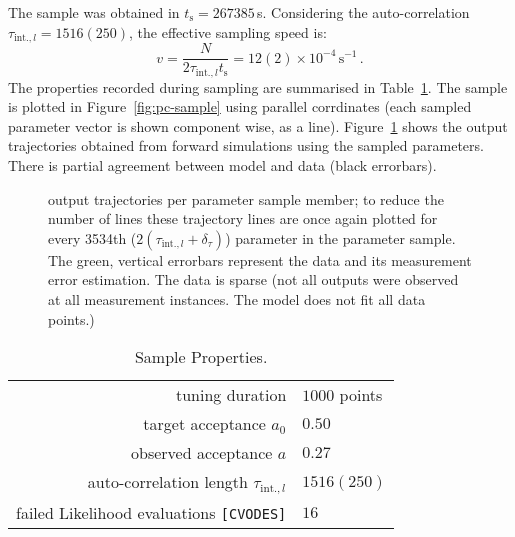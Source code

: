 \documentclass[english]{scrartcl}
\begin{document}
The sample was obtained in $t_{\text{s}}=267385$\,s. Considering the
auto-correlation $\tau_{\text{int.},l}=1516(250)$, the effective
sampling speed is:
\begin{equation}
  \label{eq:speed}
  v=\frac{N}{2\tau_{\text{int.},l} t_{\text{s}}}=12(2)\times 10^{-4}\,\text{s}^{-1}\,.
\end{equation}
The properties recorded during sampling are summarised in
Table~\ref{tab:sp}. The sample is plotted in
Figure~\ref{fig:pc-sample} using parallel corrdinates (each sampled
parameter vector is shown component wise, as a
line). Figure~\ref{fig:osmpl} shows the output trajectories obtained
from forward simulations using the sampled parameters. There is
partial agreement between model and data (black errorbars).
\begin{figure}
  \sffamily\tiny
  \hspace*{-3cm}
  \caption{output trajectories per parameter sample member;
    to reduce the number of lines these trajectory lines are once
    again plotted for every 3534th
    ($2(\tau_{\text{int.},l}+\delta_\tau)$) parameter in the parameter
    sample. The green, vertical errorbars represent the data and its
    measurement error estimation. The data is sparse (not all outputs
    were observed at all measurement instances. The model does not fit
    all data points.)\label{fig:osmpl}}
\end{figure}

\begin{table}
  \centering
  \begin{tabular}{rl}
    \toprule
    tuning duration& $1000$ points\\
    target acceptance $a_0$&$0.50$\\
    observed acceptance $a$&$0.27$\\
    auto-correlation length $\tau_{\text{int.},l}$&$1516(250)$\\
    failed Likelihood evaluations \texttt{[CVODES]}&$16$\\
    \bottomrule
  \end{tabular}
  \caption{Sample Properties.\label{tab:sp}}
\end{table}
\end{document}
